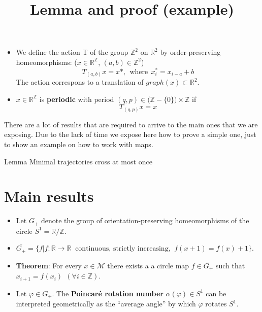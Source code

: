 \documentclass[12 pt]{beamer}
\begin{document}
\begin{frame}
	
	\begin{itemize}
		\item We define the action T of the group $\mathbb{Z}^{2}$ on $\mathbb{R}^{2}$ by order-preserving homeomorphisms: ($x \in \mathbb{R}^{\mathbb{Z}}$, $(a, b) \in \mathbb{Z}^{2}$)
			$$
				T_{(a, b)} x = x*, \ \ \text{where} \ \ x^{*}_{i} = x_{i - a} + b
			$$
		The action correspons to a translation of $graph(x) \subset \mathbb{R}^{2}$.
		\item $x \in \mathbb{R}^{\mathbb{Z}}$ is \textbf{periodic} with period $(q, p) \in \big( \mathbb{Z} - \{ 0 \} \big) \times \mathbb{Z}$ if
			$$
				T_{(q, p)} x = x
			$$
	\end{itemize}
\end{frame}

\begin{frame}
	\title{Lemma and proof (example)}
	There are a lot of results that are required to arrive to the main ones that we are exposing. Due to the lack of time we expose here how to prove a simple one, just to show an example on how to work with maps.
	
	\begin{exampleblock}{Lemma}
		Minimal trajectories cross at most once
	\end{exampleblock}
\end{frame}


\section{Main results}

\begin{frame}
	
	\begin{itemize}
	\item  Let $G_{+}$ denote the group of orientation-preserving homeomorphisms of the circle $S^{1} = \mathbb{R} / \mathbb{Z}$.
	\item $\bar{G_{+}} = \{ f | f : \mathbb{R} \rightarrow \mathbb{R} \ \text{  continuous, strictly increasing, } \ f(x+ 1) = f(x) + 1 \}$.
	\item \textbf{Theorem}: For every $x \in \mathcal{M}$ there exists a a circle map $f \in \bar{G_{+}}$ such that $x_{i + 1} = f (x_i) \ \ (\forall i \in \mathbb{Z})$.
	\item Let $\varphi \in G_{+}$. The \textbf{Poincar\'e rotation number} $\alpha( \varphi) \in S^{1}$ can be interpreted geometrically as the ``average angle'' by which $\varphi$ rotates $S^{1}$.
	\end{itemize}
\end{frame}
\end{document}
